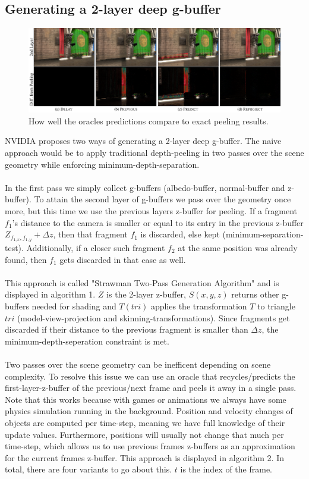 \documentclass{ACGSeminar}
\begin{document}
	\subsection{Generating a 2-layer deep g-buffer}
		\begin{figure}[htb!]
			\includegraphics[width=\textwidth]{img/generating2.png}%
			\caption{How well the oracles predictions compare to exact peeling results.}
			\label{fig:generating}%
		\end{figure}
		NVIDIA proposes two ways of generating a 2-layer deep g-buffer. The naive approach would be to apply traditional depth-peeling in two passes over the scene geometry while enforcing minimum-depth-separation. \\\\
		In the first pass we simply collect g-buffers (albedo-buffer, normal-buffer and z-buffer). To attain the second layer of g-buffers we pass over the geometry once more, but this time we use the previous layers z-buffer for peeling. If a fragment $f_1$'s distance to the camera is smaller or equal to its entry in the previous z-buffer $Z_{f_{1,x},f_{1,y}} + \Delta z$, then that fragment $f_1$ is discarded, else kept (minimum-separation-test). Additionally, if a closer such fragment $f_2$ at the same position was already found, then $f_1$ gets discarded in that case as well. \\\\
		This approach is called "Strawman Two-Pass Generation Algorithm" and is displayed in algorithm 1. $Z$ is the 2-layer z-buffer, $S(x, y, z)$ returns other g-buffers needed for shading and $T(tri)$ applies the transformation $T$ to triangle $tri$ (model-view-projection and skinning-transformations). Since fragments get discarded if their distance to the previous fragment is smaller than $\Delta z$, the minimum-depth-seperation constraint is met. \\\\
		Two passes over the scene geometry can be inefficent depending on scene complexity. To resolve this issue we can use an oracle that recycles/predicts the first-layer-z-buffer of the previous/next frame and peels it away in a single pass. Note that this works because with games or animations we always have some physics simulation running in the background. Position and velocity changes of objects are computed per time-step, meaning we have full knowledge of their update values. Furthermore, positions will usually not change that much per time-step, which allows us to use previous frames z-buffers as an approximation for the current frames z-buffer. This approach is displayed in algorithm 2. In total, there are four variants to go about this. $t$ is the index of the frame.%
\end{document}
